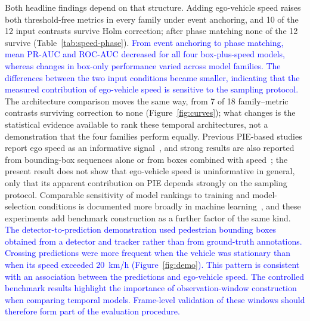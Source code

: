 \documentclass[mti,article,submit,moreauthors]{Definitions/mdpi}
\begin{document}
Both headline findings depend on that structure. Adding ego-vehicle speed raises both threshold-free metrics in every family under event anchoring, and 10 of the 12 input contrasts survive Holm correction; after phase matching none of the 12 survive (Table~\ref{tab:speed-phase}). %
\textcolor{blue}{From event anchoring to phase matching, mean PR-AUC and ROC-AUC
decreased for all four box-plus-speed models, whereas changes in
box-only performance varied across model families.
The differences between the two input conditions became smaller,
indicating that the measured contribution of ego-vehicle speed
is sensitive to the sampling protocol.} The architecture comparison moves the same way, from 7 of 18 family--metric contrasts surviving correction to none (Figure~\ref{fig:curves}); what changes is the statistical evidence available to rank these temporal architectures, not a demonstration that the four families perform equally. Previous PIE-based studies report ego speed as an informative signal~\citep{lorenzo2021intformer,azarmi2024featureimportance}, and strong results are also reported from bounding-box sequences alone or from boxes combined with speed~\citep{achaji2022attention,chen2024pedcmt}; the present result does not show that ego-vehicle speed is uninformative in general, only that its apparent contribution on PIE depends strongly on the sampling protocol. Comparable sensitivity of model rankings to training and model-selection conditions is documented more broadly in machine learning~\citep{melis2018sota,lucic2018gans}, and these experiments add benchmark construction as a further factor of the same kind. %
\textcolor{blue}{The detector-to-prediction demonstration used pedestrian bounding boxes obtained from a detector and tracker rather than from ground-truth annotations. Crossing predictions were more frequent when the vehicle was stationary than when its speed exceeded 20~km/h (Figure~\ref{fig:demo}). This pattern is consistent with an association between the predictions and ego-vehicle speed. The controlled benchmark results highlight the importance of observation-window construction when comparing temporal models. Frame-level validation of these windows should therefore form part of the evaluation procedure.}
\end{document}
